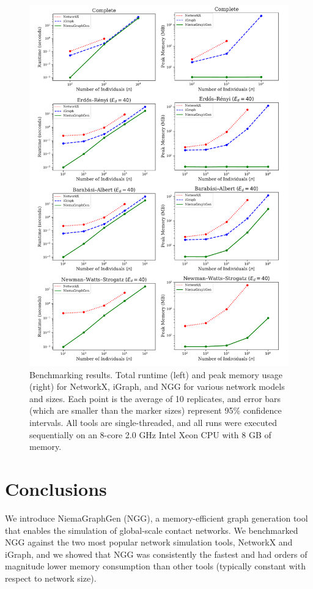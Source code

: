 \documentclass[a4paper,num-refs,gigabyte]{oup-contemporary}
\begin{document}
\begin{figure}%
\centering
\includegraphics[width=\textwidth]{Fig1}
\caption{Benchmarking results. Total runtime (left) and peak memory usage (right) for NetworkX, iGraph, and NGG for various network models and sizes. Each point is the average of 10 replicates, and error bars (which are smaller than the marker sizes) represent 95\% confidence intervals. All tools are single-threaded, and all runs were executed sequentially on an 8-core 2.0 GHz Intel Xeon CPU with 8 GB of memory.}\label{fig:benchmark}
\end{figure}

\section{Conclusions}
We introduce NiemaGraphGen (NGG), a memory-efficient graph generation tool that enables the simulation of global-scale contact networks. We benchmarked NGG against the two most popular network simulation tools, NetworkX and iGraph, and we showed that NGG was consistently the fastest and had orders of magnitude lower memory consumption than other tools (typically constant with respect to network size).
\end{document}
